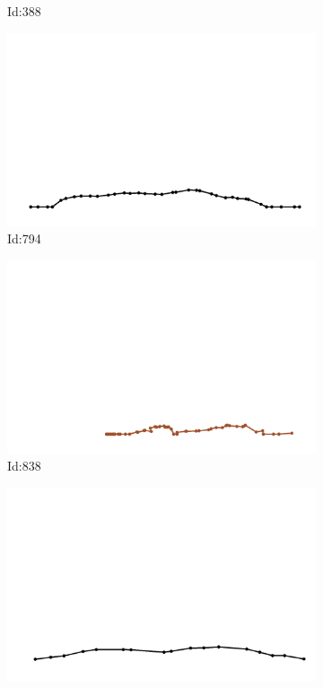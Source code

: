 \documentclass[12pt,twoside]{report}
\begin{document}
\begin{figure}
\begin{subfigure}[b]{0.20\textwidth}
\caption{Id:388}
\end{subfigure}
\begin{subfigure}[b]{0.20\textwidth}
\centering
\includegraphics[width=\textwidth]{../../trajectories/794.png}
\caption{Id:794}
\end{subfigure}
\begin{subfigure}[b]{0.20\textwidth}
\centering
\includegraphics[width=\textwidth]{../../trajectories/838.png}
\caption{Id:838}
\end{subfigure}
\begin{subfigure}[b]{0.20\textwidth}
\centering
\includegraphics[width=\textwidth]{../../trajectories/941.png}

\end{subfigure}
\end{figure}
\end{document}
